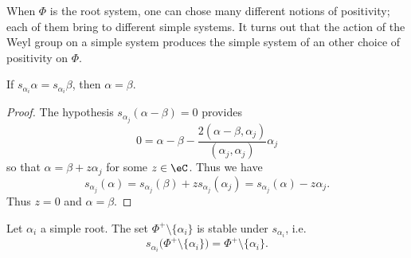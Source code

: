 When \( \Phi\) is the root system, one can chose many different notions of positivity; each of them bring to different simple systems. It turns out that the action of the Weyl group on a simple system produces the simple system of an other choice of positivity on \( \Phi\).

\begin{lemma}       \label{LemalphajsPhipinjsasbab}
	If \( s_{\alpha_i}\alpha=s_{\alpha_i}\beta\), then \( \alpha=\beta\).
\end{lemma}

\begin{proof}
	The hypothesis \( s_{\alpha_j}(\alpha-\beta)=0\) provides
	\begin{equation}
		0=\alpha-\beta-\frac{ 2(\alpha-\beta,\alpha_j) }{ (\alpha_j,\alpha_j) }\alpha_j
	\end{equation}
	so that \( \alpha=\beta+z\alpha_j\) for some \( z\in\eC\). Thus we have
	\begin{equation}
		s_{\alpha_j}(\alpha)=s_{\alpha_j}(\beta)+zs_{\alpha_j}(\alpha_j)=s_{\alpha_j}(\alpha)-z\alpha_j.
	\end{equation}
	Thus \( z=0\) and \( \alpha=\beta\).
\end{proof}

\begin{proposition}     \label{PropsalphaisurjPhipmaj}
	Let \( \alpha_i\) a simple root. The set \( \Phi^+\setminus\{ \alpha_i \}\) is stable under \( s_{\alpha_i}\), i.e.
	\begin{equation}
		s_{\alpha_i}\big( \Phi^+\setminus\{ \alpha_i \} \big)=\Phi^+\setminus\{ \alpha_i \}.
	\end{equation}
\end{proposition}

